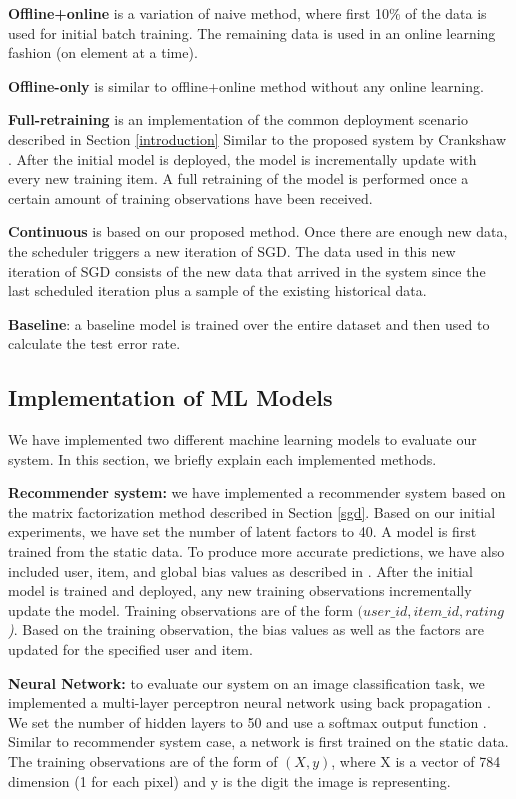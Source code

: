 \documentclass{sig-alternate-05-2015}
\begin{document}
\textbf{Offline+online} is a variation of naive method, where first 10\% of the data is used for initial batch training.
The remaining data is used in an online learning fashion (on element at a time). 

\textbf{Offline-only} is similar to offline+online method without any online learning.

\textbf{Full-retraining} is an implementation of the common deployment scenario described in Section \ref{introduction}
Similar to the proposed system by Crankshaw \cite{crankshaw2014missing}. 
After the initial model is deployed, the model is incrementally update with every new training item.
A full retraining of the model is performed once a certain amount of training observations have been received.

\textbf{Continuous} is based on our proposed method. 
Once there are enough new data, the scheduler triggers a new iteration of SGD. 
The data used in this new iteration of SGD consists of the new data that arrived in the system since the last scheduled iteration plus a sample of the existing historical data.

\textbf{Baseline}: a baseline model is trained over the entire dataset and then used to calculate the test error rate. 

\subsection{Implementation of ML Models}
We have implemented two different machine learning models to evaluate our system.
In this section, we briefly explain each implemented methods.

\textbf{Recommender system:} we have implemented a recommender system based on the matrix factorization method described in Section \ref{sgd}.
Based on our initial experiments, we have set the number of latent factors to 40.
A model is first trained from the static data.
To produce more accurate predictions, we have also included user, item, and global bias values as described in \cite{koren2009matrix}.
After the initial model is trained and deployed, any new training observations incrementally update the model.
Training observations are of the form \textit{\((user\_id, item\_id, rating\))}.
Based on the training observation, the bias values as well as the factors are updated for the specified user and item.

\textbf{Neural Network:} to evaluate our system on an image classification task, we implemented a multi-layer perceptron neural network using back propagation \cite{collobert2004links}.
We set the number of hidden layers to 50 and use a softmax output function \cite{bishop2006pattern}.
Similar to recommender system case, a network is first trained on the static data.
The training observations are of the form of \textit{\((X,y)\)}, where X is a vector of 784 dimension (1 for each pixel) and y is the digit the image is representing.
\end{document}
